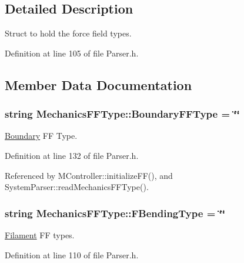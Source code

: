 \subsection{Detailed Description}
Struct to hold the force field types. 

Definition at line 105 of file Parser.\+h.



\subsection{Member Data Documentation}
\hypertarget{structMechanicsFFType_ad83b593a03dacd9224f526da4714aa25}{
\subsubsection[{Boundary\+F\+F\+Type}]{\setlength{\rightskip}{0pt plus 5cm}string Mechanics\+F\+F\+Type\+::\+Boundary\+F\+F\+Type = \char`\"{}\char`\"{}}}\label{structMechanicsFFType_ad83b593a03dacd9224f526da4714aa25}


\hyperlink{classBoundary}{Boundary} F\+F Type. 



Definition at line 132 of file Parser.\+h.



Referenced by M\+Controller\+::initialize\+F\+F(), and System\+Parser\+::read\+Mechanics\+F\+F\+Type().

\hypertarget{structMechanicsFFType_acbd0076ef804005b56b6db07dce03589}{
\subsubsection[{F\+Bending\+Type}]{\setlength{\rightskip}{0pt plus 5cm}string Mechanics\+F\+F\+Type\+::\+F\+Bending\+Type = \char`\"{}\char`\"{}}}\label{structMechanicsFFType_acbd0076ef804005b56b6db07dce03589}


\hyperlink{classFilament}{Filament} F\+F types. 



Definition at line 110 of file Parser.\+h.



